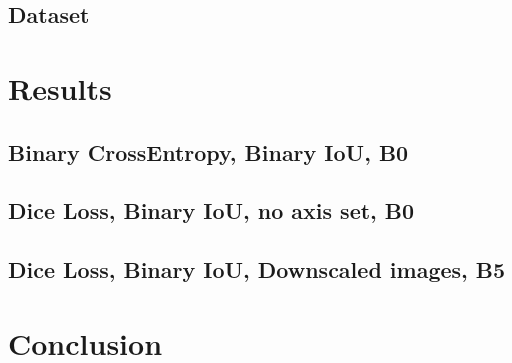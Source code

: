 \documentclass[12pt]{article}
\begin{document}
    \subsection*{Dataset}

    \section{Results}

    \subsection{Binary CrossEntropy, Binary IoU, B0}

    \subsection*{Dice Loss, Binary IoU, no axis set, B0}

    \subsection*{Dice Loss, Binary IoU, Downscaled images, B5}

    \section{Conclusion}

\end{document}
